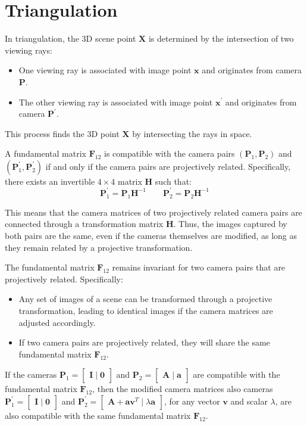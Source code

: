 \section{Triangulation}

In triangulation, the 3D scene point $\mathbf{X}$ is determined by the intersection of two viewing rays:
\begin{itemize}
    \item One viewing ray is associated with image point $\mathbf{x}$ and originates from camera $\mathbf{P}$. 
    \item The other viewing ray is associated with image point $\mathbf{x}^\prime$  and originates from camera $\mathbf{P}^\prime$. 
\end{itemize}
This process finds the 3D point $\mathbf{X}$ by intersecting the rays in space.

\begin{theorem}
    A fundamental matrix $\mathbf{F}_{12}$ is compatible with the camera pairs $(\mathbf{P}_1,\mathbf{P}_2)$ and $(\mathbf{P}_1^\prime,\mathbf{P}_2^\prime)$ if and only if the camera pairs are projectively related.
    Specifically, there exists an invertible ${4\times 4}$ matrix $\mathbf{H}$ such that:
    \[\mathbf{P}_1^\prime=\mathbf{P}_1\mathbf{H}^{-1} \qquad \mathbf{P}_2^\prime=\mathbf{P}_2\mathbf{H}^{-1}\]
\end{theorem}
This means that the camera matrices of two projectively related camera pairs are connected through a transformation matrix $\mathbf{H}$.
Thus, the images captured by both pairs are the same, even if the cameras themselves are modified, as long as they remain related by a projective transformation.

The fundamental matrix $\mathbf{F}_{12}$ remains invariant for two camera pairs that are projectively related. 
Specifically:
\begin{itemize}
    \item Any set of images of a scene can be transformed through a projective transformation, leading to identical images if the camera matrices are adjusted accordingly.
    \item If two camera pairs are projectively related, they will share the same fundamental matrix $\mathbf{F}_{12}$. 
\end{itemize}
If the cameras $\mathbf{P}_1=\begin{bmatrix} \mathbf{I}  \mid  \mathbf{0} \end{bmatrix}$ and $\mathbf{P}_2=\begin{bmatrix} \mathbf{A} \mid \mathbf{a} \end{bmatrix}$ are compatible with the fundamental matrix $\mathbf{F}_{12}$, then the modified camera matrices
also cameras $\mathbf{P}_1^\prime=\begin{bmatrix} \mathbf{I} \mid \mathbf{0} \end{bmatrix}$ and $\mathbf{P}_2^\prime=\begin{bmatrix} \mathbf{A}+\mathbf{av}^T \mid \lambda\mathbf{a} \end{bmatrix}$, for any vector $\mathbf{v}$ and scalar $\lambda$, are also compatible with the same fundamental matrix $\mathbf{F}_{12}$.